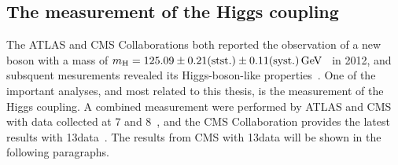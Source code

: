 \subsection{The measurement of the Higgs coupling}
The ATLAS and CMS Collaborations both reported the observation of a new boson with a mass of $m_{\mathrm{H}}=125.09\pm 0.21(\text{stst.})\pm 0.11(\text{syst.})\,\text{Ge\hspace{-.08em}V}$~\cite{Aad:2015zhl} in 2012, and subsquent mesurements revealed its Higgs-boson-like properties~\cite{Chatrchyan:2012jja,Khachatryan:2014kca,Aad:2012tfa,Chatrchyan:2012xdj,Chatrchyan:2013lba,Aad:2015gba,Khachatryan:2014jba,Aad:2013xqa}. One of the important analyses, and most related to this thesis, is the measurement of the Higgs coupling.  A combined measurement were performed by ATLAS and CMS with data collected at 7 and 8\TeV~\cite{Khachatryan:2016vau}, and the CMS Collaboration provides the latest results with 13\TeV data~\cite{CMS-PAS-HIG-17-031}. The results from CMS with 13\TeV data will be shown in the following paragraphs.

